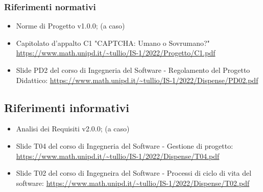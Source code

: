 \subsubsection{Riferimenti normativi}

\begin{itemize}
	\item Norme di Progetto v1.0.0; (a caso)
	\item Capitolato d'appalto C1 "CAPTCHA: Umano o Sovrumano?"
		\url{https://www.math.unipd.it/~tullio/IS-1/2022/Progetto/C1.pdf}
	\item Slide PD2 del corso di Ingegneria del Software - Regolamento del Progetto Didattico:
		\url{https://www.math.unipd.it/~tullio/IS-1/2022/Dispense/PD02.pdf}
\end{itemize}

\subsection{Riferimenti informativi}
\begin{itemize}
	\item Analisi dei Requisiti v2.0.0; (a caso)
	\item Slide T04 del corso di Ingegneria del Software - Gestione di progetto:
		\url{https://www.math.unipd.it/~tullio/IS-1/2022/Dispense/T04.pdf}
	\item Slide T02 del corso di Ingegneira del Software - Processi di ciclo di vita del software:
		\url{https://www.math.unipd.it/~tullio/IS-1/2022/Dispense/T02.pdf}
\end{itemize}




